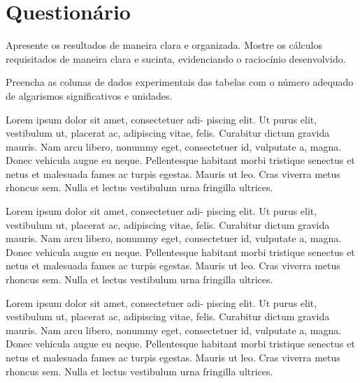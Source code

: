 \vspace{5mm}

\section{Questionário}

\begin{question}[type={exam}]{1}
Apresente os resultados de maneira clara e organizada. Mostre os cálculos requisitados de maneira clara e sucinta, evidenciando o raciocínio desenvolvido.
\end{question}

\begin{question}[type={exam}]{1}
Preencha as colunas de dados experimentais das tabelas com o número adequado de algarismos significativos e unidades.
\end{question}

\begin{question}[type={exam}]{2}
Lorem ipsum dolor sit amet, consectetuer adi-
piscing elit. Ut purus elit, vestibulum ut, placerat ac, adipiscing vitae,
felis. Curabitur dictum gravida mauris. Nam arcu libero, nonummy
eget, consectetuer id, vulputate a, magna. Donec vehicula augue
eu neque. Pellentesque habitant morbi tristique senectus et netus
et malesuada fames ac turpis egestas. Mauris ut leo. Cras viverra
metus rhoncus sem. Nulla et lectus vestibulum urna fringilla ultrices.
\end{question}

\begin{question}[type={exam}]{2}
Lorem ipsum dolor sit amet, consectetuer adi-
piscing elit. Ut purus elit, vestibulum ut, placerat ac, adipiscing vitae,
felis. Curabitur dictum gravida mauris. Nam arcu libero, nonummy
eget, consectetuer id, vulputate a, magna. Donec vehicula augue
eu neque. Pellentesque habitant morbi tristique senectus et netus
et malesuada fames ac turpis egestas. Mauris ut leo. Cras viverra
metus rhoncus sem. Nulla et lectus vestibulum urna fringilla ultrices.
\end{question}

\begin{question}[type={exam}]{2}
Lorem ipsum dolor sit amet, consectetuer adi-
piscing elit. Ut purus elit, vestibulum ut, placerat ac, adipiscing vitae,
felis. Curabitur dictum gravida mauris. Nam arcu libero, nonummy
eget, consectetuer id, vulputate a, magna. Donec vehicula augue
eu neque. Pellentesque habitant morbi tristique senectus et netus
et malesuada fames ac turpis egestas. Mauris ut leo. Cras viverra
metus rhoncus sem. Nulla et lectus vestibulum urna fringilla ultrices.
\end{question}

